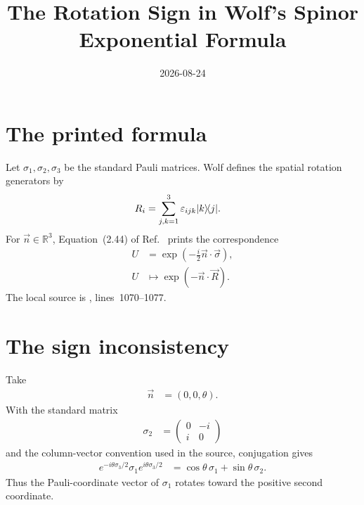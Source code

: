 \documentclass{article}
\title{The Rotation Sign in Wolf's Spinor Exponential Formula}
\author{}
\date{2026-08-24}
\begin{document}
\maketitle
{}

\section{The printed formula}

Let $\sigma_1,\sigma_2,\sigma_3$ be the standard Pauli matrices. Wolf defines
the spatial rotation generators by
\begin{align}
    R_i
        &=\sum_{j,k=1}^{3}
          \varepsilon_{ijk}|k\rangle\!\langle j|.
    \label{eq:wolf_ch2_spinor_rotation_sign_rotation_generators}
\end{align}
For $\vec n\in\mathbb R^3$, Equation~(2.44) of
Ref.~\cite{Wolf2012Quantum} prints the correspondence
\begin{align}
    U
        &=\exp\!\left(-\frac{i}{2}\vec n\mathbin{\cdot}\vec\sigma\right),
    \label{eq:wolf_ch2_spinor_rotation_sign_printed_spinor}\\
    U
        &\longmapsto
          \exp\!\left(-\vec n\mathbin{\cdot}\vec R\right).
    \label{eq:wolf_ch2_spinor_rotation_sign_printed_rotation}
\end{align}
The local source is
, lines~1070--1077.

\section{The sign inconsistency}

Take
\begin{align}
    \vec n
        &=(0,0,\theta).
    \label{eq:wolf_ch2_spinor_rotation_sign_z_axis_parameter}
\end{align}
With the standard matrix
\begin{align}
    \sigma_2
        &=\begin{pmatrix}
            0 & -i\\
            i & 0
          \end{pmatrix}
    \label{eq:wolf_ch2_spinor_rotation_sign_pauli_two}
\end{align}
and the column-vector convention used in the source, conjugation gives
\begin{align}
    e^{-i\theta\sigma_3/2}\sigma_1e^{i\theta\sigma_3/2}
        &=\cos\theta\,\sigma_1+\sin\theta\,\sigma_2.
    \label{eq:wolf_ch2_spinor_rotation_sign_pauli_conjugation}
\end{align}
Thus the Pauli-coordinate vector of $\sigma_1$ rotates toward the positive
second coordinate.
\end{document}
